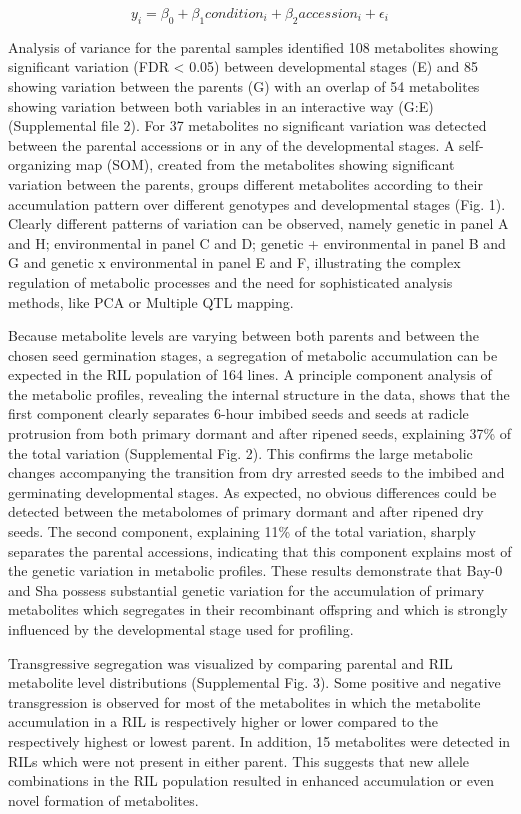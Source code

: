 $$ y_{i}   =   \beta_{0} + \beta_{1}condition_{i} + \beta_{2}accession_{i} + \epsilon_{i} $$

Analysis of variance for the parental samples identified 108 metabolites showing significant variation (FDR < 0.05) between 
developmental stages (E) and 85 showing variation between the parents (G) with an overlap of 54 metabolites showing variation 
between both variables in an interactive way (G:E) (Supplemental file 2). For 37 metabolites no significant variation was 
detected between the parental accessions or in any of the developmental stages. A self-organizing map (SOM), created from the 
metabolites showing significant variation between the parents, groups different metabolites according to their accumulation 
pattern over different genotypes and developmental stages (Fig. 1). Clearly different patterns of variation can be observed, 
namely genetic in panel A and H; environmental in panel C and D; genetic + environmental in panel B and G and genetic x 
environmental in panel E and F, illustrating the complex regulation of metabolic processes and the need for sophisticated 
analysis methods, like PCA or Multiple QTL mapping\cite{Arends:2010}. 

Because metabolite levels are varying between both parents and between the chosen seed germination stages, a segregation of 
metabolic accumulation can be expected in the RIL population of 164 lines. A principle component analysis of the metabolic 
profiles, revealing the internal structure in the data, shows that the first component clearly separates 6-hour imbibed seeds 
and seeds at radicle protrusion from both primary dormant and after ripened seeds, explaining 37\% of the total variation 
(Supplemental Fig. 2). This confirms the large metabolic changes accompanying the transition from dry arrested seeds to the 
imbibed and germinating developmental stages. As expected, no obvious differences could be detected between the metabolomes 
of primary dormant and after ripened dry seeds. The second component, explaining 11\% of the total variation, sharply separates 
the parental accessions, indicating that this component explains most of the genetic variation in metabolic profiles. These 
results demonstrate that Bay-0 and Sha possess substantial genetic variation for the accumulation of primary metabolites which 
segregates in their recombinant offspring and which is strongly influenced by the developmental stage used for profiling.

Transgressive segregation was visualized by comparing parental and RIL metabolite level distributions (Supplemental Fig. 3). 
Some positive and negative transgression is observed for most of the metabolites in which the metabolite accumulation in a 
RIL is respectively higher or lower compared to the respectively highest or lowest parent. In addition, 15 metabolites were 
detected in RILs which were not present in either parent. This suggests that new allele combinations in the RIL population 
resulted in enhanced accumulation or even novel formation of metabolites.

